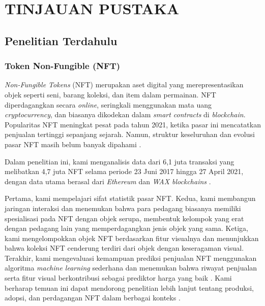 \setlength{\parindent}{1cm}    %
\setlength{\parskip}{1em}      %
\sloppy  %
\chapter{TINJAUAN PUSTAKA}

\section{Penelitian Terdahulu}

\subsection{Token Non-Fungible (NFT)}
\textit{Non-Fungible Tokens} (NFT) merupakan aset digital yang merepresentasikan objek seperti seni, barang koleksi, dan item dalam permainan. NFT diperdagangkan secara \textit{online}, seringkali menggunakan mata uang \textit{cryptocurrency}, dan biasanya dikodekan dalam \textit{smart contracts} di \textit{blockchain}. Popularitas NFT meningkat pesat pada tahun 2021, ketika pasar ini mencatatkan penjualan tertinggi sepanjang sejarah. Namun, struktur keseluruhan dan evolusi pasar NFT masih belum banyak dipahami \parencite{ref1}.

Dalam penelitian ini, kami menganalisis data dari 6,1 juta transaksi yang melibatkan 4,7 juta NFT selama periode 23 Juni 2017 hingga 27 April 2021, dengan data utama berasal dari \textit{Ethereum} dan \textit{WAX blockchains} \parencite{ref2}. 

Pertama, kami mempelajari sifat statistik pasar NFT. Kedua, kami membangun jaringan interaksi dan menemukan bahwa para pedagang biasanya memiliki spesialisasi pada NFT dengan objek serupa, membentuk kelompok yang erat dengan pedagang lain yang memperdagangkan jenis objek yang sama. Ketiga, kami mengelompokkan objek NFT berdasarkan fitur visualnya dan menunjukkan bahwa koleksi NFT cenderung terdiri dari objek dengan keseragaman visual. Terakhir, kami mengevaluasi kemampuan prediksi penjualan NFT menggunakan algoritma \textit{machine learning} sederhana dan menemukan bahwa riwayat penjualan serta fitur visual berkontribusi sebagai prediktor harga yang baik \parencite{ref3}. Kami berharap temuan ini dapat mendorong penelitian lebih lanjut tentang produksi, adopsi, dan perdagangan NFT dalam berbagai konteks \parencite{ref4}.

